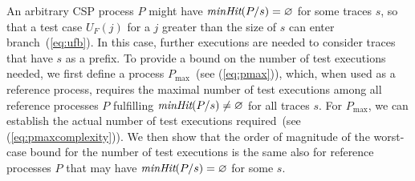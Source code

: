 \documentclass[3p,times]{elsarticle}
\newcommand{\minhits}{\text{\it minHit}}
\newcommand{\pmax}{P_\text{max}}
\begin{document}
An arbitrary CSP process $P$ might have $\minhits(P/s) = \varnothing$ for
some traces $s$, so that a test case $U_F(j)$ for a $j$ greater than the size
of $s$ can enter branch~(\ref{eq:ufb}). In this case, further executions are
needed to consider traces that have $s$ as a prefix.  To provide a bound on
the number of test executions needed, we first define a process $\pmax$~(see
(\ref{eq:pmax})), which, when used as a reference process, requires the
maximal number of test executions among all reference processes $P$
fulfilling $\minhits(P/s) \neq \varnothing$ for all traces $s$. For $\pmax$,
we can establish the actual number of test executions required~(see
(\ref{eq:pmaxcomplexity})). We then show that the order of magnitude of the
worst-case bound for the number of test executions is the same also for
reference processes $P$ that may have $\minhits(P/s) = \varnothing$ for some
$s$.

\end{document}
